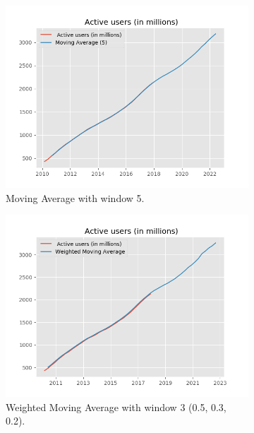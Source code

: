 \begin{figure}[t]
\begin{subfigure}[t]{0.30\linewidth}
\includegraphics[width=\linewidth ]{fig/fb_ma.png}
\caption{{\footnotesize Moving Average with window 5.}}\vspace{-2mm}
\label{fig:pla1}
\end{subfigure}
\begin{subfigure}[t]{0.30\linewidth}
\includegraphics[width=\linewidth ]{fig/fb_wma.png}
\caption{{\footnotesize Weighted Moving Average with window 3 (0.5, 0.3, 0.2).}}\vspace{-2mm}
\label{fig:pla2}
\end{subfigure}
\begin{subfigure}[t]{0.30\linewidth}

\end{subfigure}
\end{figure}
